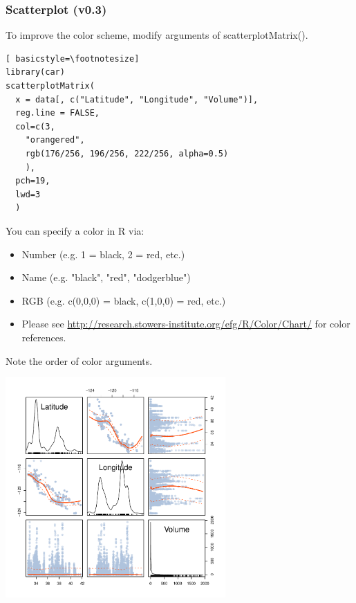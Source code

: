 \begin{frame}
\frametitle{Scatterplot (v0.3)}

To improve the color scheme, modify arguments of \ttfamily scatterplotMatrix().  
  		\begin{lstlisting}[ basicstyle=\footnotesize]
library(car)		
scatterplotMatrix(
  x = data[, c("Latitude", "Longitude", "Volume")], 
  reg.line = FALSE,
  col=c(3,
    "orangered",
    rgb(176/256, 196/256, 222/256, alpha=0.5)
    ), 
  pch=19,
  lwd=3
  )
		\end{lstlisting}
\normalfont
\framebreak
You can specify a color in R via: 
\begin{itemize}
	\item Number (e.g. 1 = black, 2 = red, etc.)
	\item Name (e.g. "black", "red", "dodgerblue")
	\item RGB (e.g. c(0,0,0) = black, c(1,0,0) = red, etc.)
	\item Please see \url{http://research.stowers-institute.org/efg/R/Color/Chart/} for color references. 
\end{itemize}

\noindent Note the order of color arguments. \normalfont
        \begin{center}
         \includegraphics[width=0.63\textwidth]{images/scatterPlot_v3.pdf}
        \end{center}
\end{frame}



